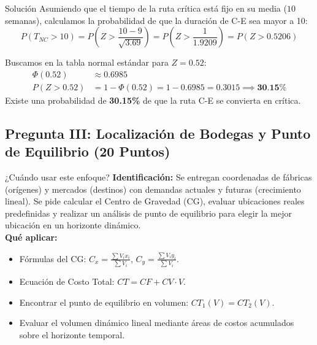\documentclass[11pt, a4paper]{article}
\begin{document}
\begin{ejercicio}{Solución}
  Asumiendo que el tiempo de la ruta crítica está fijo en su media ($10$ semanas), calculamos la probabilidad de que la duración de C-E sea mayor a 10:
  \begin{equation*}
    P(T_{NC} > 10) = P\left(Z > \frac{10 - 9}{\sqrt{3.69}}\right) = P\left(Z > \frac{1}{1.9209}\right) = P(Z > 0.5206)
  \end{equation*}

  Buscamos en la tabla normal estándar para $Z = 0.52$:
  \begin{align*}
    \Phi(0.52) &\approx 0.6985 \\
    P(Z > 0.52) &= 1 - \Phi(0.52) = 1 - 0.6985 = 0.3015 \implies \textbf{30.15\%}
  \end{align*}
  Existe una probabilidad de \textbf{30.15\%} de que la ruta C-E se convierta en crítica.

\end{ejercicio}

\newpage

\subsection*{Pregunta III: Localización de Bodegas y Punto de Equilibrio (20 Puntos)}

  \begin{tipprueba}{¿Cuándo usar este enfoque?}
    \textbf{Identificación:} Se entregan coordenadas de fábricas (orígenes) y mercados (destinos) con demandas actuales y futuras (crecimiento lineal). Se pide calcular el Centro de Gravedad (CG), evaluar ubicaciones reales predefinidas y realizar un análisis de punto de equilibrio para elegir la mejor ubicación en un horizonte dinámico.\\
    \textbf{Qué aplicar:}
    \begin{itemize}
      \item Fórmulas del CG: $C_x = \frac{\sum V_i x_i}{\sum V_i}$, $C_y = \frac{\sum V_i y_i}{\sum V_i}$.
      \item Ecuación de Costo Total: $CT = CF + CV \cdot V$.
      \item Encontrar el punto de equilibrio en volumen: $CT_1(V) = CT_2(V)$.
      \item Evaluar el volumen dinámico lineal mediante áreas de costos acumulados sobre el horizonte temporal.
    \end{itemize}
  \end{tipprueba}
\end{document}

